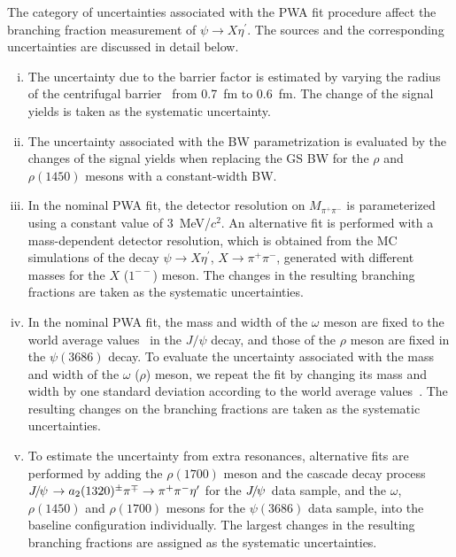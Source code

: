 \documentclass[twocolumn,showpacs,aps,prd]{revtex4-1}
\newcommand{\etap}{\eta^{\prime}}
\newcommand{\psip}{\psi(3686)}
\begin{document}
The category of uncertainties associated with the PWA fit procedure affect the branching fraction measurement of $\psi \to X \etap$. The sources and the corresponding uncertainties are discussed in detail below.
%
\begin{enumerate}[(i)]

  \item The uncertainty due to the barrier factor is estimated by varying the radius of the centrifugal barrier~\cite{barrier}
  from 0.7~fm to 0.6~fm. The change of the signal yields is taken as the systematic uncertainty.

  \item The uncertainty associated with the BW parametrization is evaluated by the changes of the signal yields when replacing the GS BW for the
  $\rho$ and $\rho(1450)$ mesons with a constant-width BW.

  \item In the nominal PWA fit, the detector resolution on $M_{\pi^{+}\pi^{-}}$ is parameterized using a constant value of 3~MeV/$c^2$. An alternative fit is performed
  with a mass-dependent detector resolution, which is obtained from the MC simulations of the decay $\psi \to X \etap$, $X \to \pi^{+}\pi^{-}$, generated with different masses for the $X$ ($1^{--}$) meson. The changes in the resulting branching fractions are taken as the systematic uncertainties.

  \item In the nominal PWA fit, the mass and width of the $\omega$ meson are fixed to the world average values~\cite{pdg} in the $J/\psi$ decay, and those of the $\rho$ meson are fixed in the $\psip$ decay. To evaluate the uncertainty associated with the mass and width of the $\omega$ ($\rho$) meson, we repeat the fit by changing its mass and width by one standard deviation according to the world average values~\cite{pdg}. The resulting changes on the branching fractions are taken as the systematic uncertainties.

  \item To estimate the uncertainty from extra resonances, alternative fits are performed by adding the $\rho(1700)$ meson and the cascade decay process $\jpsi \to a_{2}(1320)^{\pm} \pi^{\mp} \to \pi^{+} \pi^{-}\etap$ for the ${J\mskip -3mu/\mskip -2mu\psi\mskip 2mu}$ data sample, and the $\omega$, $\rho(1450)$ and $\rho(1700)$ mesons for the $\psip$ data sample, into the baseline configuration individually. The largest changes in the resulting branching fractions are assigned as the systematic uncertainties.


\end{enumerate}
\end{document}
